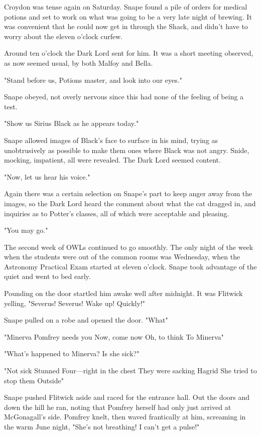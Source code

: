 Croydon was tense again on Saturday. Snape found a pile of orders for medical potions and set to work on what was going to be a very late night of brewing. It was convenient that he could now get in through the Shack, and didn't have to worry about the eleven o'clock curfew.

Around ten o'clock the Dark Lord sent for him. It was a short meeting observed, as now seemed usual, by both Malfoy and Bella.

"Stand before us, Potions master, and look into our eyes."

Snape obeyed, not overly nervous since this had none of the feeling of being a test.

"Show us Sirius Black as he appears today."

Snape allowed images of Black's face to surface in his mind, trying as unobtrusively as possible to make them ones where Black was not angry. Snide, mocking, impatient, all were revealed. The Dark Lord seemed content.

"Now, let us hear his voice."

Again there was a certain selection on Snape's part to keep anger away from the images, so the Dark Lord heard the comment about what the cat dragged in, and inquiries as to Potter's classes, all of which were acceptable and pleasing.

"You may go."

The second week of OWLs continued to go smoothly. The only night of the week when the students were out of the common rooms was Wednesday, when the Astronomy Practical Exam started at eleven o'clock. Snape took advantage of the quiet and went to bed early.

Pounding on the door startled him awake well after midnight. It was Flitwick yelling, "Severus! Severus! Wake up! Quickly!"

Snape pulled on a robe and opened the door. "What{\el}"

"Minerva{\el} Pomfrey needs you{\el} Now, come now{\el} Oh, to think{\el} To Minerva{\el}"

"What's happened to Minerva? Is she sick?"

"Not sick{\el} Stunned{\el} Four—right in the chest{\el} They were sacking Hagrid{\el} She tried to stop them{\el} Outside{\el}"

Snape pushed Flitwick aside and raced for the entrance hall. Out the doors and down the hill he ran, noting that Pomfrey herself had only just arrived at McGonagall's side. Pomfrey knelt, then waved frantically at him, screaming in the warm June night, "She's not breathing! I can't get a pulse!"

